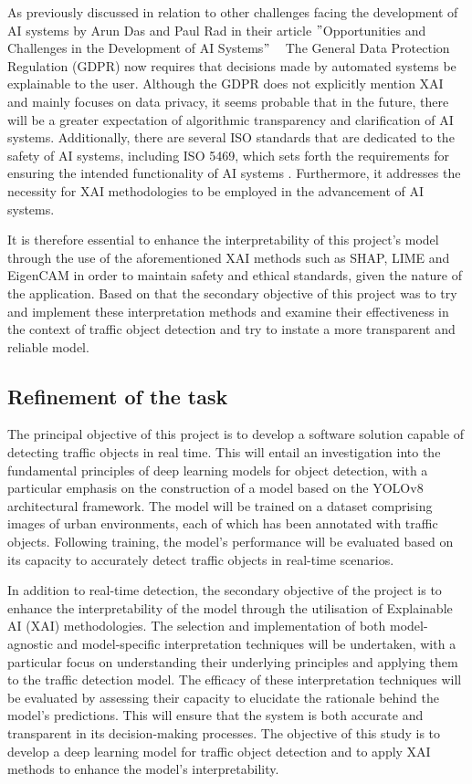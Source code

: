As previously discussed in relation to other challenges facing the development of AI systems by Arun Das and Paul Rad in their article
\("\)Opportunities and Challenges in the Development of AI Systems\("\) ~\cite{das2020opportunitieschallengesexplainableartificial}
The General Data Protection Regulation (GDPR) now requires that decisions made by automated systems be
explainable to the user.
Although the GDPR does not explicitly mention XAI and mainly focuses on data privacy,
it seems probable that in the future, there will be a greater expectation of algorithmic transparency and clarification of AI systems.
Additionally, there are several ISO standards that are dedicated to the safety of AI systems,
including ISO 5469\cite{ISO5469:2021}, which sets forth the requirements for ensuring the intended functionality of AI systems .
Furthermore, it addresses the necessity for XAI methodologies to be employed in the advancement of AI systems.

It is therefore essential to enhance the interpretability of this project's model through the use of the aforementioned
XAI methods such as SHAP, LIME and EigenCAM in order to maintain safety and ethical standards, given the nature of the
application.
Based on that the secondary objective of this project was to try and implement these interpretation methods and examine their
effectiveness in the context of traffic object detection and try to instate a more transparent and reliable model.

\subsection{Refinement of the task}\label{subsec:Refinement-of-the-task} %


The principal objective of this project is to develop a software solution capable of detecting traffic objects in real time.
This will entail an investigation into the fundamental principles of deep learning models for object detection, with a
particular emphasis on the construction of a model based on the YOLOv8 architectural framework.
The model will be trained on a dataset comprising images of urban environments, each of which has been annotated with
traffic objects.
Following training, the model's performance will be evaluated based on its capacity to accurately detect traffic objects
in real-time scenarios.

In addition to real-time detection, the secondary objective of the project is to enhance the interpretability of the
model through the utilisation of Explainable AI (XAI) methodologies.
The selection and implementation of both model-agnostic and model-specific interpretation techniques will be undertaken,
with a particular focus on understanding their underlying principles and applying them to the traffic detection model.
The efficacy of these interpretation techniques will be evaluated by assessing their capacity to elucidate the
rationale behind the model's predictions.
This will ensure that the system is both accurate and transparent in its decision-making processes.
The objective of this study is to develop a deep learning model for traffic object detection and to apply XAI
methods to enhance the model's interpretability.

